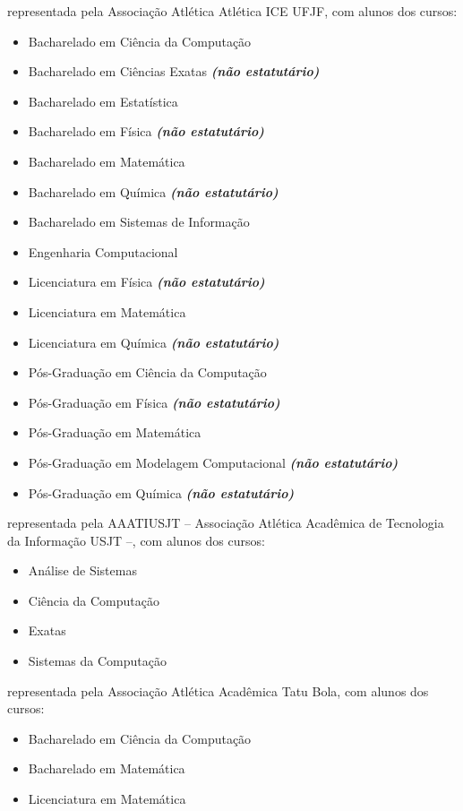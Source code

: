 \begin{article}
\begin{description}[noitemsep]
		\item[UFJF] representada pela Associação Atlética Atlética ICE UFJF, com alunos dos cursos:
		\begin{itemize}[noitemsep]
			\item Bacharelado em Ciência da Computação
			\item Bacharelado em Ciências Exatas \textbf{\textit{(não estatutário)}}
			\item Bacharelado em Estatística
			\item Bacharelado em Física \textbf{\textit{(não estatutário)}}
			\item Bacharelado em Matemática
			\item Bacharelado em Química \textbf{\textit{(não estatutário)}}
			\item Bacharelado em Sistemas de Informação
			\item Engenharia Computacional
			\item Licenciatura em Física \textbf{\textit{(não estatutário)}}
			\item Licenciatura em Matemática
			\item Licenciatura em Química \textbf{\textit{(não estatutário)}}
			\item Pós-Graduação em Ciência da Computação
			\item Pós-Graduação em Física \textbf{\textit{(não estatutário)}}
			\item Pós-Graduação em Matemática
			\item Pós-Graduação em Modelagem Computacional \textbf{\textit{(não estatutário)}}
			\item Pós-Graduação em Química \textbf{\textit{(não estatutário)}}
		\end{itemize}

		\item[Universidade São Judas Tadeu] representada pela AAATIUSJT -- Associação Atlética Acadêmica de Tecnologia da Informação USJT --, com alunos dos cursos:
		\begin{itemize}[noitemsep]
			\item Análise de Sistemas
			\item Ciência da Computação
			\item Exatas
			\item Sistemas da Computação
		\end{itemize}
		
		\item[UNESP - Rio Claro] representada pela Associação Atlética Acadêmica Tatu Bola, com alunos dos cursos:
		\begin{itemize}[noitemsep]
			\item Bacharelado em Ciência da Computação
			\item Bacharelado em Matemática
			\item Licenciatura em Matemática
		\end{itemize}


\end{description}
\end{article}
